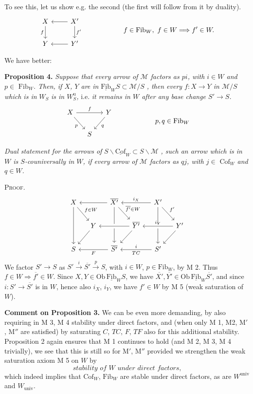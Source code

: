 \documentclass[11pt]{article}
\newcommand{\printedpage}[1]{\marginpar{\footnotesize p.~#1}}
\newcommand{\msp}[1]{\marginpar{\footnotesize [#1]}}
\newcommand{\cM}{\mathcal{M}}
\newcommand{\Cof}{\mathrm{Cof}}
\newcommand{\Fib}{\mathrm{Fib}}
\newcommand{\Ob}{\mathrm{Ob}}
\begin{document}
To see this, let us show e.g. the second (the first will follow from it by duality).
\[
\begin{tikzcd}
X \ar[d,"f"'] & X' \ar[l] \ar[d,"f'"] \\
Y & Y' \ar[l]
\end{tikzcd}
\qquad\qquad\qquad
f\in\Fib_W,\ f\in W\Longrightarrow f'\in W.
\]

\printedpage{7}
We have better:

\textbf{Proposition 4.} \textit{Suppose that every arrow of $\cM$ factors as $pi$, with $i\in W$ and $p\in$} $\Fib_W$\textit{. Then, if $X$, $Y$ are in} $\underline{\Fib}_W S\subset\cM/S$ \textit{, then every $f:X\longrightarrow Y$ in $\cM/S$ which is in} $W_S$ \textit{is in $W^{\mathrm{u}}_S$,} i.e. \textit{it remains in $W$ after any base change $S'\longrightarrow S$.}
\[
\begin{tikzcd}[column sep=small]
X \ar[rr,"f"] \ar[dr,"p"'] & & Y \ar[dl,"q"] \\
& S &
\end{tikzcd}
\qquad\qquad\qquad
p,q\in\Fib_W
\]

\textit{Dual statement for the arrows of} $S\backslash\underline{\Cof}_W\subset S\backslash\cM$ \textit{, such an arrow which is in $W$ is $S$-couniversally in $W$, if every arrow of $\cM$ factors as $qj$, with $j\in$} $\Cof_W$ \textit{and $q\in W$.}

\msp{page 11}\textsc{Proof}.
\[
\begin{tikzcd}[column sep=small]
X \ar[dr,"f\in W"] \ar[dd] & & \overline{X'} \ar[ll] \ar[dr,"\overline{f'}\in W"] \ar[dd] & & X' \ar[ll,"i_X"'] \ar[dr,"f'"] \ar[dd] & \\
& Y \ar[dl] & & \overline{Y'} \ar[ll,crossing over] \ar[dl] & & Y' \ar[ll,"i_Y"',crossing over] \ar[dl] \\
S & & \overline{S'} \ar[ll,"F"] & & S' \ar[ll,"i"',"TC"] &
\end{tikzcd}
\]
We factor $S'\longrightarrow S$ as $S'\overset{i}{\longrightarrow}\overline{S'}\overset{p}{\longrightarrow}S$, with $i\in W$, $p\in\Fib_W$, by M 2. Thus $f\in W\Longrightarrow\overline{f'}\in W$. Since $X,Y\in\Ob\,\underline{\Fib}_W S$, we have $\overline{X'},\overline{Y'}\in\Ob\,\underline{\Fib}_W\overline{S'}$, and since $i:S'\longrightarrow\overline{S'}$ is in $W$, hence also $i_X$, $i_Y$, we have $f'\in W$ by M 5 (weak saturation of $W$).

\textbf{Comment on Proposition 3.} We can be even more demanding, by also requiring in M 3, M 4 stability under direct factors, and (when only M 1, M2, M$'$, M$''$ %
are satisfied) by saturating $C$, $TC$, $F$, $TF$ also for this additional stability. Proposition 2 again ensures that M 1 continues to hold (and M 2, M 3, M 4 trivially), we see that this is still so for M$'$, M$''$ provided we strengthen the weak saturation axiom M 5 on $W$ by
\[
\textit{stability of $W$ under direct factors,}
\]
which indeed implies that $\Cof_W$, $\Fib_W$ are stable under direct factors, as are $W^{\mathrm{univ}}$ and $W_{\mathrm{univ}}$.
\end{document}
